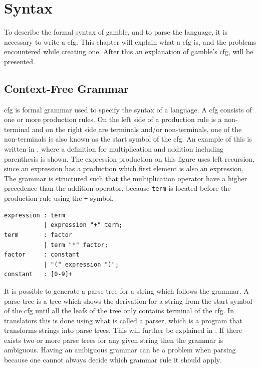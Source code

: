 \chapter{Syntax}\label{chap:syntax}

To describe the formal syntax of \gls{gamble}, and to parse the language, it is necessary to write a \acrfull{cfg}.
This chapter will explain what a \acrshort{cfg} is, and the problems encountered while creating one.
After this an explanation of \gls{gamble}'s \acrshort{cfg}, will be presented.

\section{Context-Free Grammar}\label{sec:cfg}
\acrshort{cfg} is formal grammar used to specify the syntax of a language.
A \acrshort{cfg} consists of one or more production rules.
On the left side of a production rule is a non-terminal and on the right side are terminals and/or non-terminals, one of the non-terminals is also known as the start symbol of the \acrshort{cfg}.
An example of this is written in , where a definition for multiplication and addition including parenthesis is shown.
The expression production on this figure uses left recursion, since an expression has a production which first element is also an expression.
The grammar is structured such that the multiplication operator have a higher precedence than the addition operator, because \texttt{term} is located before the production rule using the \texttt{+} symbol.

\begin{lstlisting}[caption={An example of a \acrshort{cfg} written in \acrshort{ebnf}, with \acrshort{regex} for defining numbers. },frame=tlrb,label={lst:cfglst1},numbers=none]
expression : term 
           | expression "+" term;
term       : factor 
           | term "*" factor;
factor     : constant 
           | "(" expression ")";
constant   : [0-9]+
\end{lstlisting}

It is possible to generate a parse tree for a string which follows the grammar.
A parse tree is a tree which shows the derivation for a string from the start symbol of the \acrshort{cfg} until all the leafs of the tree only contains terminal of the \acrshort{cfg}. 
In translators this is done using what is called a parser, which is a program that transforms strings into parse trees. 
This will further be explained in .
If there exists two or more parse trees for any given string then the grammar is ambiguous. 
Having an ambiguous grammar can be a problem when parsing because one cannot always decide which grammar rule it should apply.

